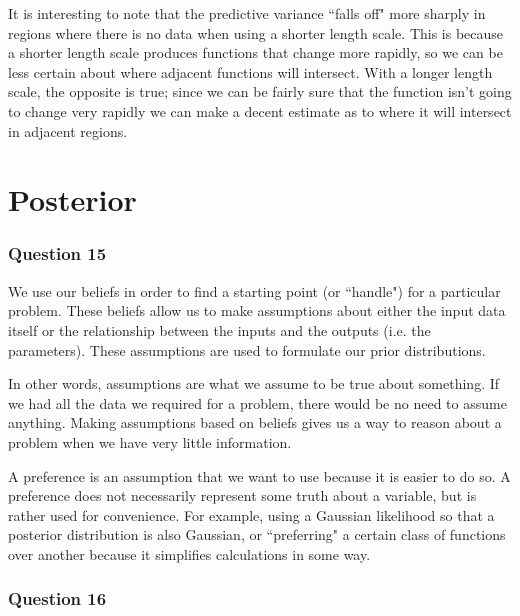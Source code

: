 \documentclass[10pt, a4paper, twocolumn]{article} %
\begin{document}
It is interesting to note that the predictive variance ``falls off" more sharply in regions where there is no data when using a shorter length scale. This is because a shorter length scale produces functions that change more rapidly, so we can be less certain about where adjacent functions will intersect. With a longer length scale, the opposite is true; since we can be fairly sure that the function isn't going to change very rapidly we can make a decent estimate as to where it will intersect in adjacent regions.




\section{Posterior}

\subsubsection*{Question 15}
We use our beliefs in order to find a starting point (or ``handle") for a particular problem. These beliefs allow us to make assumptions about either the input data itself or the relationship between the inputs and the outputs (i.e. the parameters). These assumptions are used to formulate our prior distributions.

In other words, assumptions are what we assume to be true about something. If we had all the data we required for a problem, there would be no need to assume anything. Making assumptions based on beliefs gives us a way to reason about a problem when we have very little information.

A preference is an assumption that we want to use because it is easier to do so. A preference does not necessarily represent some truth about a variable, but is rather used for convenience. For example, using a Gaussian likelihood so that a posterior distribution is also Gaussian, or ``preferring" a certain class of functions over another because it simplifies calculations in some way.

\subsubsection*{Question 16}
\end{document}
